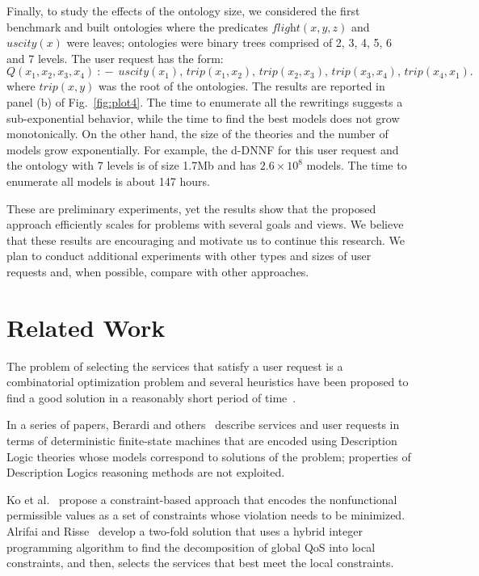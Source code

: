 \documentclass{llncs}
\newcommand{\qrule}{:\!\!-}
\newcommand{\trip}{\textit{trip}}
\newcommand{\flight}{\textit{flight}}
\newcommand{\UScity}{\textit{uscity}}
\begin{document}
Finally, to study the effects of the ontology size, we considered the first benchmark and built 
ontologies where the predicates $\flight(x,y,z)$ and $\UScity(x)$ were leaves; ontologies were binary trees comprised of 2, 3, 4, 5, 6 and 7 levels.  The user request has the form: 
\[ Q(x_1,x_2,x_3,x_4)\ \qrule\  \UScity(x_1),\,\trip(x_1,x_2),\,\trip(x_2,x_3),\,\trip(x_3,x_4),\,\trip(x_4,x_1).\]
where $trip(x,y)$ was the root of the ontologies.  The results are reported in panel 
(b) of Fig.~\ref{fig:plot4}. The time to enumerate all the rewritings suggests a sub-exponential behavior, while the time to find the best models does not grow monotonically. On the other hand, 
the size of the theories and the number of models grow exponentially.  For example, the d-DNNF for 
this user request and the ontology with 7 levels is of size 1.7Mb and has
$2.6\times 10^8$ models. The time to enumerate all models is about 147 hours. 

These are preliminary experiments, yet the results show that the
proposed approach efficiently scales for problems with several goals
and views. We believe that these results are encouraging and motivate
us to continue this research. We plan to conduct additional experiments
with other types and sizes of user requests and, when possible, compare with
other approaches.


\section{Related Work}
The problem of selecting the services that satisfy a user request is a
combinatorial optimization problem and several heuristics have been
proposed to find a good solution in a reasonably short period of
time~\cite{alrifaiR09,berardi08,myoung08,kuterG09,lecue09,rahmani08,sohrabiM09,Hiroshi2008}.

In a series of papers, Berardi and
others~\cite{berardi05,berardi08,berardi06}  describe services and
user requests in terms of deterministic finite-state machines that are
encoded using Description Logic theories whose models correspond to
solutions of the problem; properties of Description Logics reasoning
methods are not exploited.   

Ko et al.~\cite{myoung08} propose a
constraint-based approach that encodes the nonfunctional permissible
values as a set of constraints whose violation needs to
be minimized. Alrifai and Risse~\cite{alrifaiR09} develop a two-fold
solution that uses a hybrid integer programming algorithm to find the
decomposition of global QoS into local constraints, and then, selects
the services that best meet the local constraints.   
\end{document}
